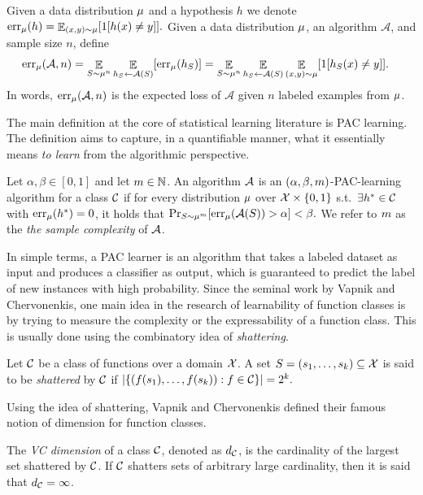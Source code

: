 \documentclass[12pt,a4paper,oneside,onecolumn]{book}
\begin{document}
\begin{definition}
Given a data distribution $\mu$ and a hypothesis $h$ we denote $\operatorname{err}_\mu(h) = 
\mathop{\mathbb{E}}_{(x,y)\sim \mu}[1[h(x)\neq y]].$ 
Given a data distribution $\mu$, an algorithm $\mathcal{A}$, and sample size $n$, define
\begin{align*}
\operatorname{err}_\mu(\mathcal{A},n) &= 
\mathop{\mathbb{E}}_{S \sim \mu^{n}}
\mathop{\mathbb{E}}_{h_S\leftarrow \mathcal{A}(S)}
[\operatorname{err}_\mu(h_S)] 
=
\mathop{\mathbb{E}}_{S \sim \mu^{n}}
\mathop{\mathbb{E}}_{h_S\leftarrow \mathcal{A}(S)}
\mathop{\mathbb{E}}_{(x,y)\sim \mu}[1[h_S(x)\neq y]].  
\end{align*}
In words, $\operatorname{err}_\mu(\mathcal{A},n)$ is the expected loss of $\mathcal{A}$ given $n$ labeled examples from $\mu$.
\end{definition}

The main definition at the core of statistical learning literature is PAC learning. The definition aims to capture, in a quantifiable manner, what it essentially means \emph{to learn} from the algorithmic perspective.
\begin{definition}
Let $\alpha,\beta\in[0,1]$ and let $m\in\mathbb{N}$.
An algorithm $\mathcal{A}$ is an $(\alpha,\beta,m)$-PAC-learning algorithm for a class $\mathcal{C}$ if for every distribution $\mu$ over $\mathcal{X}\times\{0,1\}$ s.t.\ $\exists h^*\in\mathcal{C}$ with $\mathrm{err}_{\mu}(h^*)=0$, 
it holds that 
$
\Pr_{S\sim\mu^m}[\mathrm{err}_{\mu}(\mathcal{A}(S)) > \alpha] < \beta.
$ 
We refer to $m$ as the \emph{the sample complexity} of $\mathcal{A}$.
\end{definition}

In simple terms, a PAC learner is an algorithm that takes a labeled dataset as input and produces a classifier as output, which is guaranteed to predict the label of new instances with high probability.
Since the seminal work by Vapnik and Chervonenkis, 
one main idea in the research of learnability of function classes is by trying to measure the complexity or the expressability of a function class.
This is usually done using the combinatory idea of \emph{shattering}.
\begin{definition}[Shattering]
Let $\mathcal{C}$ be a class of functions over a domain $\mathcal{X}$. A set $S = (s_1,\ldots,s_k) \subseteq \mathcal{X}$
is said to be \emph{shattered} by $\mathcal{C}$
if
$
\lvert \{(f(s_1),\ldots,f(s_k)) : f\in \mathcal{C}\} \rvert = 2^k.
$
\end{definition}

Using the idea of shattering, Vapnik and Chervonenkis defined their famous notion of dimension for function classes.
\begin{definition}
\label{def:vc-dimension}
The \emph{VC dimension} of a class $\mathcal{C}$,
denoted as $d_{\mathcal{C}}$, 
is the cardinality of the largest set shattered by $\mathcal{C}$.
If $\mathcal{C}$ shatters sets of arbitrary large cardinality, then it is said that $d_{\mathcal{C}}=\infty$.
\end{definition}
\end{document}
